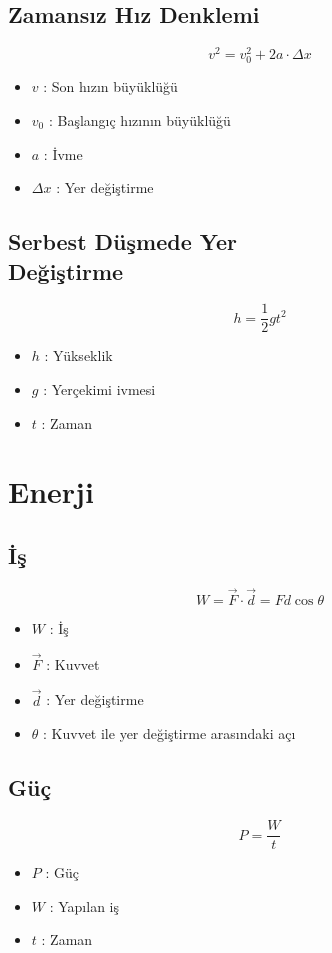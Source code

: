 \documentclass[a4paper, 11pt, titlepage]{article}
\begin{document}
\subsection{Zamansız Hız Denklemi}
\[
v^2 = v_0^2 + 2a \cdot \Delta x
\]
\begin{itemize}
  \item $v$ : Son hızın büyüklüğü
  \item $v_0$ : Başlangıç hızının büyüklüğü
  \item $a$ : İvme
  \item $\Delta x$ : Yer değiştirme
\end{itemize}

\subsection[Serbest Düşmede Yer Değiştirme]{Serbest Düşmede Yer \\Değiştirme}
\[
h = \frac{1}{2} g t^2
\]
\begin{itemize}
  \item $h$ : Yükseklik
  \item $g$ : Yerçekimi ivmesi
  \item $t$ : Zaman
\end{itemize}

\section{Enerji}
\subsection{İş}
\[
W = \vec{F} \cdot \vec{d} = F d \cos \theta
\]
\begin{itemize}
  \item $W$ : İş
  \item $\vec{F}$ : Kuvvet
  \item $\vec{d}$ : Yer değiştirme
  \item $\theta$ : Kuvvet ile yer değiştirme arasındaki açı
\end{itemize}

\subsection{Güç}
\[
P = \frac{W}{t}
\]
\begin{itemize}
  \item $P$ : Güç
  \item $W$ : Yapılan iş
  \item $t$ : Zaman
\end{itemize}
\end{document}
